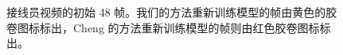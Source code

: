 \begin{figure}[t]
  \center {}
  \hspace{4mm} 
\caption{接线员视频的初始 48 帧。我们的方法重新训练模型的帧由黄色的胶
  卷图标标出，Cheng 的方法重新训练模型的帧则由红色胶卷图标标出。}
\label{fig:telemarket}
\end{figure}


